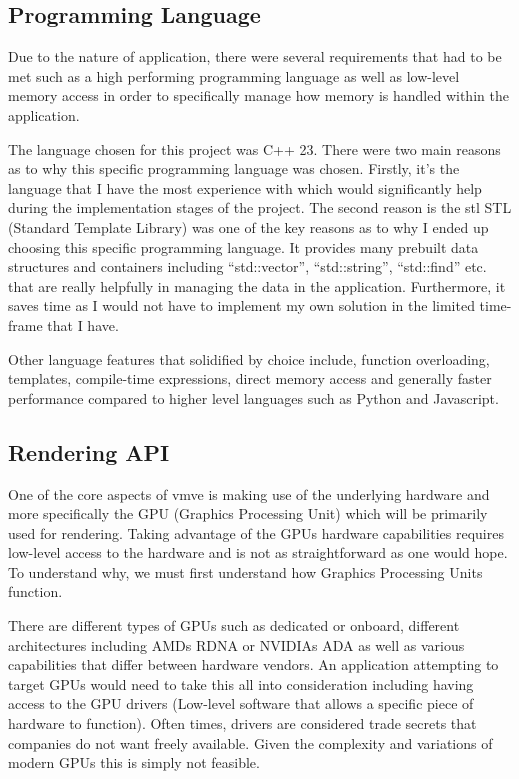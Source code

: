 \documentclass[11pt]{article}
\begin{document}
\subsection{Programming Language}
Due to the nature of application, there were several requirements that had to be
met such as a high performing programming language as well as low-level memory
access in order to specifically manage how memory is handled within the
application.

The language chosen for this project was C++ 23.  There were two main reasons
as to why this specific programming language was chosen. Firstly, it's the language
that I have the most experience with which would significantly help during the 
implementation stages of the project. The second reason is the \gls{stl} STL (Standard
Template Library) was one of the key reasons as to why I ended up
choosing this specific programming language. It provides many prebuilt
data structures and containers including ``std::vector'', ``std::string'',
``std::find'' etc. that are really helpfully in managing the data in the application.
Furthermore, it saves time as I would not have to implement my own solution
in the limited time-frame that I have.

Other language features that solidified by choice include, function overloading,
templates, compile-time expressions, direct memory access and generally faster
performance compared to higher level languages such as Python and Javascript.

\subsection{Rendering API} \label{rendering_api}
One of the core aspects of \gls{vmve} is making use of the underlying hardware and
more specifically the GPU (Graphics Processing Unit) which will be primarily
used for rendering. Taking advantage of the GPUs hardware capabilities requires
low-level access to the hardware and is not as straightforward as one would
hope. To understand why, we must first understand how Graphics Processing Units
function.

There are different types of GPUs such as dedicated or onboard, different
architectures including AMDs RDNA \cite{RDNA} or NVIDIAs ADA \cite{ADA} as well
as various capabilities that differ between hardware vendors. An application
attempting to target GPUs would need to take this all into consideration
including having access to the GPU drivers (Low-level software that allows a
specific piece of hardware to function). Often times, drivers are considered
trade secrets that companies do not want freely available. Given the complexity
and variations of modern GPUs this is simply not feasible.
\end{document}

